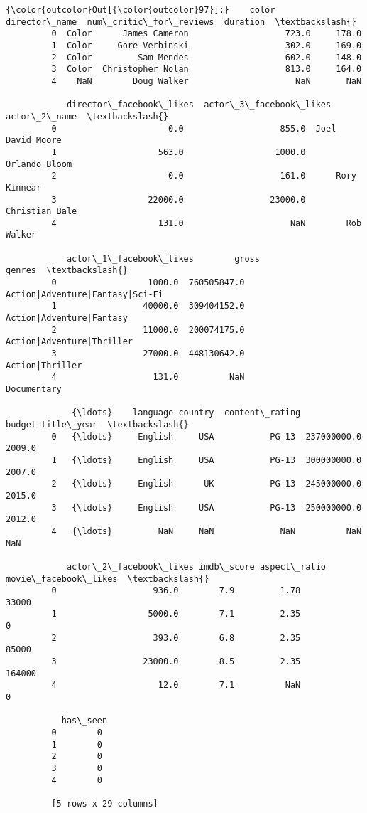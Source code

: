 \documentclass[11pt]{article}
\begin{document}
\begin{Verbatim}[commandchars=\\\{\}]
{\color{outcolor}Out[{\color{outcolor}97}]:}    color      director\_name  num\_critic\_for\_reviews  duration  \textbackslash{}
         0  Color      James Cameron                   723.0     178.0   
         1  Color     Gore Verbinski                   302.0     169.0   
         2  Color         Sam Mendes                   602.0     148.0   
         3  Color  Christopher Nolan                   813.0     164.0   
         4    NaN        Doug Walker                     NaN       NaN   
         
            director\_facebook\_likes  actor\_3\_facebook\_likes      actor\_2\_name  \textbackslash{}
         0                      0.0                   855.0  Joel David Moore   
         1                    563.0                  1000.0     Orlando Bloom   
         2                      0.0                   161.0      Rory Kinnear   
         3                  22000.0                 23000.0    Christian Bale   
         4                    131.0                     NaN        Rob Walker   
         
            actor\_1\_facebook\_likes        gross                           genres  \textbackslash{}
         0                  1000.0  760505847.0  Action|Adventure|Fantasy|Sci-Fi   
         1                 40000.0  309404152.0         Action|Adventure|Fantasy   
         2                 11000.0  200074175.0        Action|Adventure|Thriller   
         3                 27000.0  448130642.0                  Action|Thriller   
         4                   131.0          NaN                      Documentary   
         
             {\ldots}    language country  content\_rating       budget title\_year  \textbackslash{}
         0   {\ldots}     English     USA           PG-13  237000000.0     2009.0   
         1   {\ldots}     English     USA           PG-13  300000000.0     2007.0   
         2   {\ldots}     English      UK           PG-13  245000000.0     2015.0   
         3   {\ldots}     English     USA           PG-13  250000000.0     2012.0   
         4   {\ldots}         NaN     NaN             NaN          NaN        NaN   
         
            actor\_2\_facebook\_likes imdb\_score aspect\_ratio  movie\_facebook\_likes  \textbackslash{}
         0                   936.0        7.9         1.78                 33000   
         1                  5000.0        7.1         2.35                     0   
         2                   393.0        6.8         2.35                 85000   
         3                 23000.0        8.5         2.35                164000   
         4                    12.0        7.1          NaN                     0   
         
           has\_seen  
         0        0  
         1        0  
         2        0  
         3        0  
         4        0  
         
         [5 rows x 29 columns]
\end{Verbatim}
            
\end{document}
